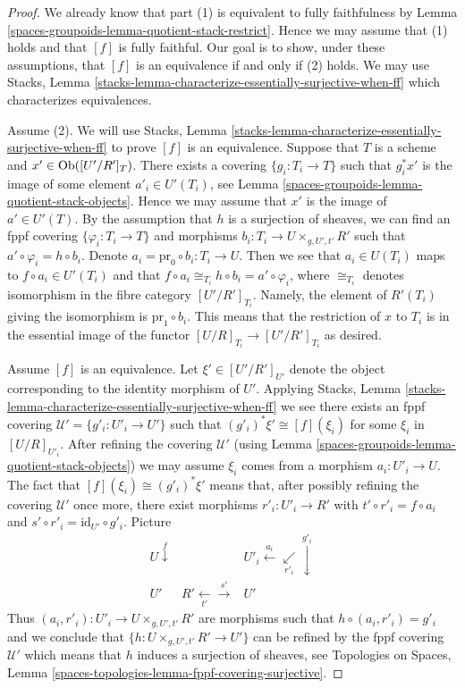 \begin{proof}
We already know that part (1) is equivalent to
fully faithfulness by
Lemma \ref{spaces-groupoids-lemma-quotient-stack-restrict}.
Hence we may assume that (1) holds and that $[f]$ is fully faithful.
Our goal is to show, under these assumptions, that $[f]$ is an equivalence
if and only if (2) holds. We may use
Stacks, Lemma \ref{stacks-lemma-characterize-essentially-surjective-when-ff}
which characterizes equivalences.

\medskip\noindent
Assume (2). We will use
Stacks, Lemma \ref{stacks-lemma-characterize-essentially-surjective-when-ff}
to prove $[f]$ is an equivalence.
Suppose that $T$ is a scheme and $x' \in \operatorname{Ob}([U'/R']_T)$.
There exists a covering $\{g_i : T_i \to T\}$ such that $g_i^*x'$
is the image of some element $a'_i \in U'(T_i)$, see
Lemma \ref{spaces-groupoids-lemma-quotient-stack-objects}.
Hence we may assume that $x'$ is the image of $a' \in U'(T)$.
By the assumption that $h$ is a surjection of sheaves, we
can find an fppf covering $\{\varphi_i : T_i \to T\}$ and morphisms
$b_i : T_i \to U \times_{g, U', t'} R'$ such that
$a' \circ \varphi_i = h \circ b_i$. Denote
$a_i = \text{pr}_0 \circ b_i : T_i \to U$. Then we see that
$a_i \in U(T_i)$ maps to $f \circ a_i \in U'(T_i)$ and
that $f \circ a_i \cong_{T_i} h \circ b_i = a' \circ \varphi_i$,
where $\cong_{T_i}$ denotes isomorphism in the fibre category
$[U'/R']_{T_i}$. Namely, the element of $R'(T_i)$ giving the isomorphism
is $\text{pr}_1 \circ b_i$. This means that the restriction
of $x$ to $T_i$ is in the essential image of the functor
$[U/R]_{T_i} \to [U'/R']_{T_i}$ as desired.

\medskip\noindent
Assume $[f]$ is an equivalence. Let $\xi' \in [U'/R']_{U'}$ denote the
object corresponding to the identity morphism of $U'$. Applying
Stacks, Lemma \ref{stacks-lemma-characterize-essentially-surjective-when-ff}
we see there exists an fppf covering $\mathcal{U}' = \{g'_i : U'_i \to U'\}$
such that $(g'_i)^*\xi' \cong [f](\xi_i)$ for some $\xi_i$ in $[U/R]_{U'_i}$.
After refining the covering $\mathcal{U}'$ (using
Lemma \ref{spaces-groupoids-lemma-quotient-stack-objects})
we may assume $\xi_i$ comes from a morphism $a_i : U'_i \to U$.
The fact that $[f](\xi_i) \cong (g'_i)^*\xi'$ means that, after possibly
refining the covering $\mathcal{U}'$ once more, there exist morphisms
$r'_i : U'_i \to R'$ with $t' \circ r'_i = f \circ a_i$ and
$s' \circ r'_i = \text{id}_{U'} \circ g'_i$. Picture
$$
\begin{array}{ccc}U \overset{f}{\downarrow} &  & U'_i \overset{a_i}{\longleftarrow}\underset{r'_i}{\swarrow}\overset{g'_i}{\downarrow} \\ U' & R' \underset{t'}{\longleftarrow}\overset{s'}{\longrightarrow} & U'\end{array}
$$
Thus $(a_i, r'_i) : U'_i \to U \times_{g, U', t'} R'$ are morphisms
such that $h \circ (a_i, r'_i) = g'_i$ and we conclude that
$\{h : U \times_{g, U', t'} R' \to U'\}$ can be refined by the
fppf covering $\mathcal{U}'$ which means that $h$ induces a surjection
of sheaves, see
Topologies on Spaces, Lemma
\ref{spaces-topologies-lemma-fppf-covering-surjective}.


\end{proof}
